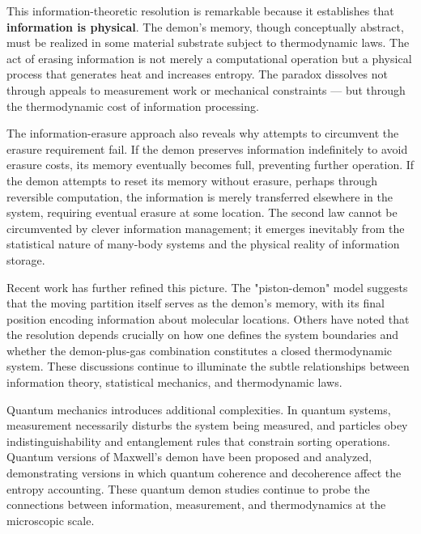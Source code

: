 This information-theoretic resolution is remarkable because it establishes that \textbf{information is physical}. The demon's memory, though conceptually abstract, must be realized in some material substrate subject to thermodynamic laws. The act of erasing information is not merely a computational operation but a physical process that generates heat and increases entropy. The paradox dissolves not through appeals to measurement work or mechanical constraints — but through the thermodynamic cost of information processing.

The information-erasure approach also reveals why attempts to circumvent the erasure requirement fail. If the demon preserves information indefinitely to avoid erasure costs, its memory eventually becomes full, preventing further operation. If the demon attempts to reset its memory without erasure, perhaps through reversible computation, the information is merely transferred elsewhere in the system, requiring eventual erasure at some location. The second law cannot be circumvented by clever information management; it emerges inevitably from the statistical nature of many-body systems and the physical reality of information storage.

Recent work has further refined this picture. The "piston-demon" model suggests that the moving partition itself serves as the demon's memory, with its final position encoding information about molecular locations. Others have noted that the resolution depends crucially on how one defines the system boundaries and whether the demon-plus-gas combination constitutes a closed thermodynamic system. These discussions continue to illuminate the subtle relationships between information theory, statistical mechanics, and thermodynamic laws.

Quantum mechanics introduces additional complexities. In quantum systems, measurement necessarily disturbs the system being measured, and particles obey indistinguishability and entanglement rules that constrain sorting operations. Quantum versions of Maxwell's demon have been proposed and analyzed, demonstrating versions in which quantum coherence and decoherence affect the entropy accounting. These quantum demon studies continue to probe the connections between information, measurement, and thermodynamics at the microscopic scale.